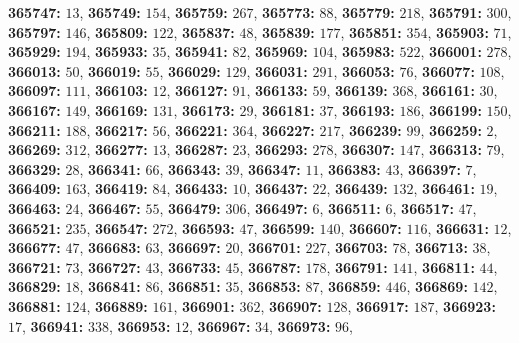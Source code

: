 \textsf{\bfseries 365747:} $13$, \textsf{\bfseries 365749:} $154$, \textsf{\bfseries 365759:} $267$, \textsf{\bfseries 365773:} $88$, \textsf{\bfseries 365779:} $218$, \textsf{\bfseries 365791:} $300$, \textsf{\bfseries 365797:} $146$, \textsf{\bfseries 365809:} $122$, \textsf{\bfseries 365837:} $48$, \textsf{\bfseries 365839:} $177$, \textsf{\bfseries 365851:} $354$, \textsf{\bfseries 365903:} $71$, \textsf{\bfseries 365929:} $194$, \textsf{\bfseries 365933:} $35$, \textsf{\bfseries 365941:} $82$, \textsf{\bfseries 365969:} $104$, \textsf{\bfseries 365983:} $522$, \textsf{\bfseries 366001:} $278$, \textsf{\bfseries 366013:} $50$, \textsf{\bfseries 366019:} $55$, \textsf{\bfseries 366029:} $129$, \textsf{\bfseries 366031:} $291$, \textsf{\bfseries 366053:} $76$, \textsf{\bfseries 366077:} $108$, \textsf{\bfseries 366097:} $111$, \textsf{\bfseries 366103:} $12$, \textsf{\bfseries 366127:} $91$, \textsf{\bfseries 366133:} $59$, \textsf{\bfseries 366139:} $368$, \textsf{\bfseries 366161:} $30$, \textsf{\bfseries 366167:} $149$, \textsf{\bfseries 366169:} $131$, \textsf{\bfseries 366173:} $29$, \textsf{\bfseries 366181:} $37$, \textsf{\bfseries 366193:} $186$, \textsf{\bfseries 366199:} $150$, \textsf{\bfseries 366211:} $188$, \textsf{\bfseries 366217:} $56$, \textsf{\bfseries 366221:} $364$, \textsf{\bfseries 366227:} $217$, \textsf{\bfseries 366239:} $99$, \textsf{\bfseries 366259:} $2$, \textsf{\bfseries 366269:} $312$, \textsf{\bfseries 366277:} $13$, \textsf{\bfseries 366287:} $23$, \textsf{\bfseries 366293:} $278$, \textsf{\bfseries 366307:} $147$, \textsf{\bfseries 366313:} $79$, \textsf{\bfseries 366329:} $28$, \textsf{\bfseries 366341:} $66$, \textsf{\bfseries 366343:} $39$, \textsf{\bfseries 366347:} $11$, \textsf{\bfseries 366383:} $43$, \textsf{\bfseries 366397:} $7$, \textsf{\bfseries 366409:} $163$, \textsf{\bfseries 366419:} $84$, \textsf{\bfseries 366433:} $10$, \textsf{\bfseries 366437:} $22$, \textsf{\bfseries 366439:} $132$, \textsf{\bfseries 366461:} $19$, \textsf{\bfseries 366463:} $24$, \textsf{\bfseries 366467:} $55$, \textsf{\bfseries 366479:} $306$, \textsf{\bfseries 366497:} $6$, \textsf{\bfseries 366511:} $6$, \textsf{\bfseries 366517:} $47$, \textsf{\bfseries 366521:} $235$, \textsf{\bfseries 366547:} $272$, \textsf{\bfseries 366593:} $47$, \textsf{\bfseries 366599:} $140$, \textsf{\bfseries 366607:} $116$, \textsf{\bfseries 366631:} $12$, \textsf{\bfseries 366677:} $47$, \textsf{\bfseries 366683:} $63$, \textsf{\bfseries 366697:} $20$, \textsf{\bfseries 366701:} $227$, \textsf{\bfseries 366703:} $78$, \textsf{\bfseries 366713:} $38$, \textsf{\bfseries 366721:} $73$, \textsf{\bfseries 366727:} $43$, \textsf{\bfseries 366733:} $45$, \textsf{\bfseries 366787:} $178$, \textsf{\bfseries 366791:} $141$, \textsf{\bfseries 366811:} $44$, \textsf{\bfseries 366829:} $18$, \textsf{\bfseries 366841:} $86$, \textsf{\bfseries 366851:} $35$, \textsf{\bfseries 366853:} $87$, \textsf{\bfseries 366859:} $446$, \textsf{\bfseries 366869:} $142$, \textsf{\bfseries 366881:} $124$, \textsf{\bfseries 366889:} $161$, \textsf{\bfseries 366901:} $362$, \textsf{\bfseries 366907:} $128$, \textsf{\bfseries 366917:} $187$, \textsf{\bfseries 366923:} $17$, \textsf{\bfseries 366941:} $338$, \textsf{\bfseries 366953:} $12$, \textsf{\bfseries 366967:} $34$, \textsf{\bfseries 366973:} $96$, 
